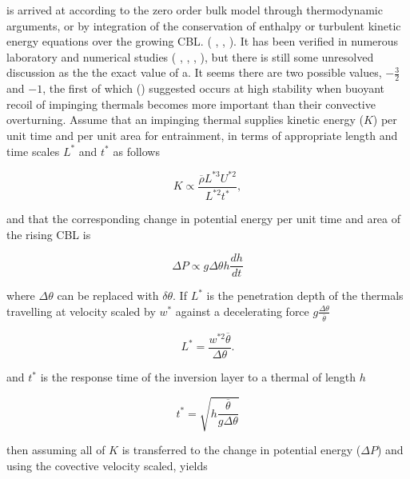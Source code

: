 is arrived at according to the zero order bulk model through thermodynamic arguments, or by integration of the conservation of enthalpy or turbulent kinetic energy equations over the growing \acs{CBL}. (\citeauthor{Tennekes73} \citeyear{Tennekes73}, \citeauthor{Deardorff79} \citeyear{Deardorff79}, \citeauthor{FedConzMir04} \citeyear{FedConzMir04}). It has been verified in numerous laboratory and numerical studies (\citeauthor{DearWill80} \citeyear{DearWill80}, \citeauthor{SullMoengStev} \citeyear{SullMoengStev}, \citeauthor{FedConzMir04} \citeyear{FedConzMir04}, \citeauthor{BrooksFowler2} \citeyear{BrooksFowler2}), but there is still some 
unresolved discussion as the the exact value of a.  It seems there are two possible values, $-\frac{3}{2}$ and $-1$, the first of which \citeauthor{Turner86} (\citeyear{Turner86}) suggested occurs at high stability when buoyant recoil of impinging thermals becomes more important than their convective overturning. Assume that an impinging thermal supplies kinetic energy ($K$) per unit time and per unit area for entrainment, in terms of appropriate length and time scales $L^{*}$ and $t^{*}$ as follows 

\begin{equation}
K \propto \frac{\overline{\rho} L^{*3} U^{*2}}{L^{*2} t^{*}},
\end{equation}

and that the corresponding change in potential energy per unit time and area of the rising \acs{CBL} is

\begin{equation}
\Delta P \propto g \Delta \theta h \frac{d h}{ dt}  
\end{equation}

where $\Delta \theta$ can be replaced with $\delta \theta$.  If $L^{*}$ is the penetration depth of the thermals travelling at velocity scaled by $w^{*}$ against a decelerating force
$g \frac{\Delta \theta}{\overline{\theta}}$

\begin{equation}
L^{*} = \frac{w^{*2} \overline{\theta}}{\Delta \theta}.  
\end{equation}

and $t^{*}$ is the response time of the inversion layer to a thermal of length $h$

\begin{equation}
t^{*} = \sqrt{h \frac{\overline{\theta}}{g \Delta \theta}}  
\end{equation}

then assuming all of $K$ is transferred to the change in potential energy ($\Delta P$) and using the covective velocity scaled, yields

